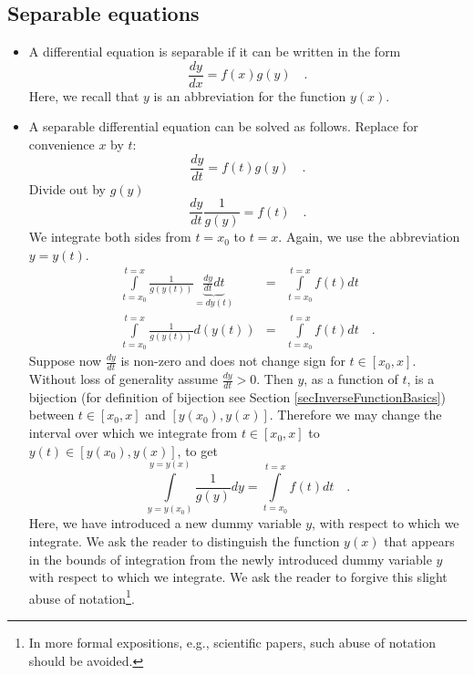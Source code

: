 \documentclass[12pt]{book}
\begin{document}
\subsection{Separable equations}
\begin{itemize}
\item A differential equation is separable if it can be written in the form 
\begin{equation}\label{eqDFQSeparable}
\frac{d y}{dx}= f(x)g(y)\quad .
\end{equation}
Here, we recall that $y$ is an abbreviation for the function $y(x)$. 
\item A separable differential equation can be solved as follows. Replace for convenience $x$ by $t$:
\[
\frac{d y}{dt}= f(t)g(y)\quad .
\]
Divide out by $g(y)$
\[
\frac{d y}{dt} \frac{1}{g(y)}= f(t)\quad .
\]
We integrate both sides from $t=x_0$ to $t=x$. Again, we use the abbreviation $y=y(t)$.
\begin{equation}\label{eqSeparableDFQSolution1}
\begin{array}{rcl}
\displaystyle \int\limits_{t=x_0}^{t=x}\frac{1}{g(y(t))} \underbrace{\frac{d y}{dt}dt}_{= d y(t)}&=&\displaystyle \int\limits_{t=x_0}^{t=x}  f(t)dt
\\ 
\displaystyle \int\limits_{t=x_0}^{t=x}\frac{1}{g(y(t))} d(y(t))&=&\displaystyle \int\limits_{t=x_0}^{t=x}  f(t)dt
\quad .
\end{array}
\end{equation}
Suppose now $\frac{dy }{dt}$ is non-zero and does not change sign for $t\in [x_0, x]$. Without loss of generality assume $\frac{dy}{dt}>0$. Then $y$, as a function of $t$, is a bijection (for definition of bijection see Section \ref{secInverseFunctionBasics}) between $t\in [x_0, x]$ and $[y(x_0), y(x)]$. Therefore we may change the interval over which we integrate from $t\in  [x_0, x]$ to $y(t)\in [y(x_0), y(x)]$, to get 
\begin{equation}\label{eqSeparableDFQSolution2}
\displaystyle \int\limits_{y=y(x_0)}^{y=y(x)}\frac{1}{g(y)} dy=\displaystyle \int\limits_{t=x_0}^{t=x}  f(t)dt\quad .
\end{equation}
Here, we have introduced a new dummy variable $y$, with respect to which we integrate. We ask the reader to distinguish  the function $y(x)$ that appears in the bounds of integration from the newly introduced dummy variable $y$ with respect to which we integrate. We ask the reader to forgive this slight abuse of notation\footnote{In more formal expositions, e.g., scientific papers, such abuse of notation should be avoided.}.


\end{itemize}
\end{document}
